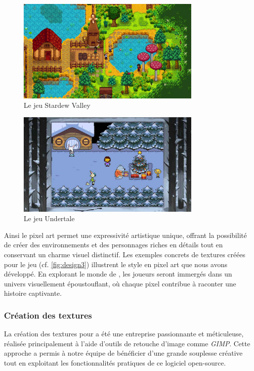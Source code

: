 \begin{figure}[H]
    \centering
    \includegraphics[width=0.8\textwidth]{2.game/assets/design1.png}
    \caption{Le jeu Stardew Valley}
    \label{fig:design1}
\end{figure}
\begin{figure}[H]
    \centering
    \includegraphics[width=0.8\textwidth]{2.game/assets/design2.png}
    \caption{Le jeu Undertale}
    \label{fig:design2}
\end{figure}

Ainsi le pixel art permet une expressivité artistique unique, offrant la possibilité de créer des environnements et des personnages riches en détails tout en conservant un charme visuel distinctif.
Les exemples concrets de textures créées pour le jeu (cf. \ref*{fig:design3}) illustrent le style en pixel art que nous avons développé.
En explorant le monde de \gameName, les joueurs seront immergés dans un univers visuellement époustouflant, où chaque pixel contribue à raconter une histoire captivante.


\subsubsection*{\hspace*{0.6cm}Création des textures}

La création des textures pour \gameName a été une entreprise passionnante et méticuleuse, réalisée principalement à l'aide d'outils de retouche d'image comme \textit{GIMP}.
Cette approche a permis à notre équipe de bénéficier d'une grande souplesse créative tout en exploitant les fonctionnalités pratiques de ce logiciel open-source.
\\


